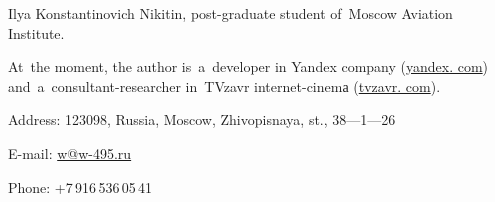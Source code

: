 

Ilya Konstantinovich Nikitin, post-graduate student of~Moscow Aviation Institute. 

At~the moment, the author is~a~developer in Yandex company
(\href{http://yandex. com}{yandex. com})
and~a~consultant-researcher in~TVzavr internet-cinemа
(\href{http://tvzavr. com}{tvzavr. com}).

Address: 123098, Russia, Moscow, Zhivopisnaya, st., 38—1—26

E-mail: \href{mailto: w@w-495.ru}{w@w-495.ru}

Phone: +7\,916\,536\,05\,41
